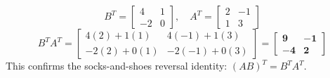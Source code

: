 \begin{enumerate}
\begin{equation*}
    B^T = \begin{bmatrix} 4 & 1 \\ -2 & 0 \end{bmatrix}, \quad A^T = \begin{bmatrix} 2 & -1 \\ 1 & 3 \end{bmatrix}
    \end{equation*}
    \begin{equation*}
    B^T A^T = \begin{bmatrix} 4(2) + 1(1) & 4(-1) + 1(3) \\ -2(2) + 0(1) & -2(-1) + 0(3) \end{bmatrix} = \mathbf{\begin{bmatrix} 9 & -1 \\ -4 & 2 \end{bmatrix}}
    \end{equation*}
    This confirms the socks-and-shoes reversal identity: $(AB)^T = B^T A^T$.
\end{enumerate}

